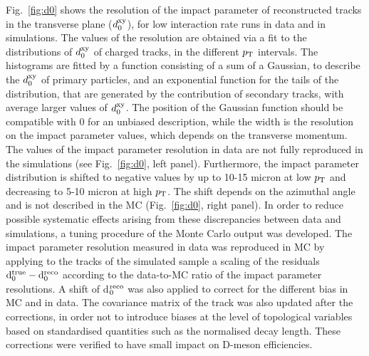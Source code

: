 Fig.~\ref{fig:d0} shows the resolution of the impact parameter of reconstructed tracks 
in the transverse plane ($d_{\rm 0}^{\rm xy}$), for low interaction rate runs in data and in simulations.
The values of the resolution are obtained via a fit to the distributions of $d_{\rm 0}^{\rm xy}$ 
of charged tracks, in the different $p_{\rm T}$ intervals. The histograms are fitted by a function consisting of a sum
of a Gaussian, to describe the $d_{\rm 0}^{\rm xy}$ of primary particles, and an exponential
function for the tails of the distribution, that are generated by the contribution of secondary tracks,
with average larger values of $d_{\rm 0}^{\rm xy}$. The position of the Gaussian function
should be compatible with 0 for an unbiased description, while the width is
the resolution on the impact parameter values, which depends on the transverse momentum.
The values of the impact parameter resolution in data are not fully reproduced
in the simulations (see Fig.~\ref{fig:d0}, left panel).
Furthermore, the impact parameter distribution is shifted to negative 
values by up to 10-15 micron at low $p_{\rm T}$ and 
decreasing to 5-10 micron at high $p_{\rm T}$. The shift 
depends on the azimuthal angle and is not described 
in the MC (Fig.~\ref{fig:d0}, right panel). 
In order to reduce possible systematic effects arising from these discrepancies
between data and simulations, a tuning procedure of the Monte Carlo output
was developed.
 The impact parameter resolution measured in data 
 was reproduced in MC by applying to the tracks of the simulated sample a scaling of 
the residuals ${\rm d}_0^{\rm true}-{\rm d}_0^{\rm reco}$ 
 according to the data-to-MC ratio of the impact parameter 
 resolutions. A shift of d$_0^{\rm reco}$ was also applied to correct for the different bias in MC and in data.
 The covariance matrix of the track was also
 updated after the corrections, in order not to introduce biases at the level
 of topological variables based on standardised quantities such as the normalised decay length. 
 These corrections were verified to have small impact on D-meson efficiencies.\\
 



